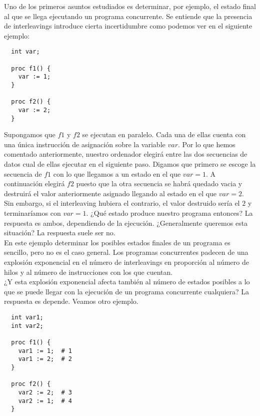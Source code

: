 Uno de los primeros asuntos estudiados es determinar, por ejemplo, el estado final al que se llega ejecutando un programa concurrente. Se entiende que la presencia de interleavings introduce cierta incertidumbre como podemos ver en el siguiente ejemplo:

\begin{lstlisting}
  int var;

  proc f1() {
    var := 1;
  }

  proc f2() {
    var := 2;
  }
\end{lstlisting}

Supongamos que $f1$ y $f2$ se ejecutan en paralelo. Cada una de ellas cuenta con una única instrucción de asignación sobre la variable $var$. Por lo que hemos comentado anteriormente, nuestro ordenador elegirá entre las dos secuencias de datos cual de ellas ejecutar en el siguiente paso. Digamos que primero se escoge la secuencia de $f1$ con lo que llegamos a un estado en el que $var = 1$. A continuación elegirá $f2$ puesto que la otra secuencia se habrá quedado vacia y destruirá el valor anteriormente asignado llegando al estado en el que $var = 2$.\\

Sin embargo, si el interleaving hubiera el contrario, el valor destruido sería el $2$ y terminaríamos con $var = 1$. ¿Qué estado produce nuestro programa entonces? La respuesta es ambos, dependiendo de la ejecución. ¿Generalmente queremos esta situación? La respuesta suele ser no.\\

En este ejemplo determinar los posibles estados finales de un programa es sencillo, pero no es el caso general. Los programas concurrentes padecen de una explosión exponencial en el número de interleavings en proporción al número de hilos y al número de instrucciones con los que cuentan.\\

¿Y esta explosión exponencial afecta también al número de estados posibles a lo que se puede llegar con la ejecución de un programa concurrente cualquiera? La respuesta es depende. Veamos otro ejemplo.

\begin{lstlisting}
  int var1;
  int var2;

  proc f1() {
    var1 := 1;  # 1
    var1 := 2;  # 2
  }

  proc f2() {
    var2 := 2;  # 3
    var2 := 1;  # 4
  }
\end{lstlisting}


